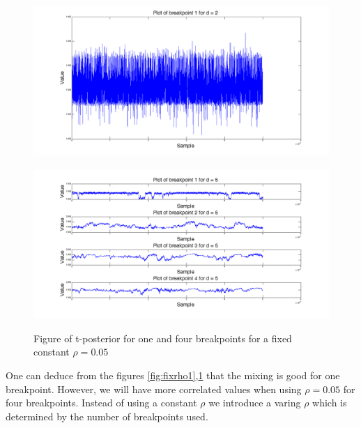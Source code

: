 \begin{figure}[H]
  \centering
\begin{minipage}{1\textwidth}
    \includegraphics[scale=0.28]{./Figures/fixrho1.png}
  \label{fig:fixrho1}
\end{minipage}
%
\begin{minipage}{1\textwidth}
    \includegraphics[scale=0.28]{./Figures/fixrho4.png}
  \label{fig:fixrho4}
\end{minipage}

  \caption[An Electron]{Figure of t-posterior for one and four breakpoints for a fixed constant $\rho=0.05$}
\end{figure}

One can deduce from the figures \ref{fig:fixrho1},\ref{fig:fixrho4} that the mixing is good for one breakpoint. However, we will have more correlated values when using $\rho=0.05$ for four breakpoints. Instead of using a constant $\rho$ we introduce a varing $\rho$ which is determined by the number of breakpoints used.

